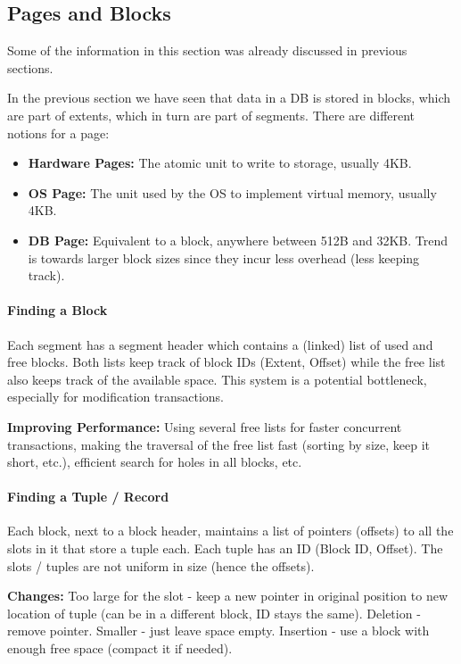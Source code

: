 \subsection{Pages and Blocks}

Some of the information in this section was already discussed in previous sections.

In the previous section we have seen that data in a DB is stored in blocks, which are part of extents, which in turn are part of segments. There are different notions for a page:

\begin{itemize}
    \item \textbf{Hardware Pages:} The atomic unit to write to storage, usually 4KB.
    \item \textbf{OS Page:} The unit used by the OS to implement virtual memory, usually 4KB.
    \item \textbf{DB Page:} Equivalent to a block, anywhere between 512B and 32KB. Trend is towards larger block sizes since they incur less overhead (less keeping track).
\end{itemize}

\paragraph{Finding a Block}
Each segment has a segment header which contains a (linked) list of used and free blocks. Both lists keep track of block IDs (Extent, Offset) while the free list also keeps track of the available space. This system is a potential bottleneck, especially for modification transactions.

\textbf{Improving Performance:} Using several free lists for faster concurrent transactions, making the traversal of the free list fast (sorting by size, keep it short, etc.), efficient search for holes in all blocks, etc.

\paragraph{Finding a Tuple / Record}
Each block, next to a block header, maintains a list of pointers (offsets) to all the slots in it that store a tuple each. Each tuple has an ID (Block ID, Offset). The slots / tuples are not uniform in size (hence the offsets).

\textbf{Changes:} Too large for the slot - keep a new pointer in original position to new location of tuple (can be in a different block, ID stays the same). Deletion - remove pointer. Smaller - just leave space empty. Insertion - use a block with enough free space (compact it if needed).

